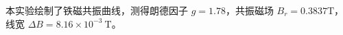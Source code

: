 \documentclass[aps,prl,preprint,groupedaddress]{revtex4-2}
\begin{document}
	本实验绘制了铁磁共振曲线，测得朗德因子 $g=1.78$，共振磁场 $B_r=0.3837\mathrm{T}$，线宽 $\Delta B=8.16\times 10^{-3}~\mathrm{T}$。


%



%
\end{document}
